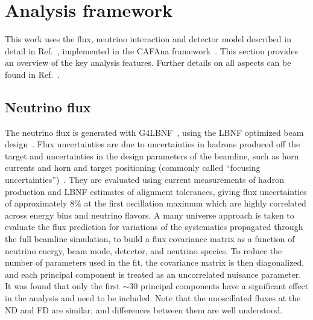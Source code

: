 \section{Analysis framework}\label{sec:analysis_framework}

This work uses the flux, neutrino interaction and detector model described in detail in Ref.~\cite{Abi:2020qib}, implemented in the CAFAna framework~\cite{CAFAna}. This section provides an overview of the key analysis features. Further details on all aspects can be found in Ref.~\cite{Abi:2020qib}.

\subsection{Neutrino flux}
The neutrino flux is generated with G4LBNF~\cite{Aliaga:2016oaz,Abi:2020evt}, using the LBNF optimized beam design~\cite{Abi:2020evt}. Flux uncertainties are due to uncertainties in hadrons produced off the target and uncertainties in the design parameters of the beamline, such as horn currents and horn and target positioning (commonly called ``focusing uncertainties'')~\cite{Abi:2020evt}. They are evaluated using current measurements of hadron production and LBNF estimates of alignment tolerances, giving flux uncertainties of approximately 8\% at the first oscillation maximum which are highly correlated across energy bins and neutrino flavors. A many universe approach is taken to evaluate the flux prediction for variations of the systematics propagated through the full beamline simulation, to build a flux covariance matrix as a function of neutrino energy, beam mode, detector, and neutrino species. To reduce the number of parameters used in the fit, the covariance matrix is then diagonalized, and each principal component is treated as an uncorrelated nuisance parameter. It was found that only the first $\sim$30 principal components have a significant effect in the analysis and need to be included. Note that the unoscillated fluxes at the ND and FD are similar, and differences between them are well understood.

